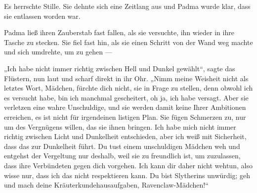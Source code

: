 Es herrschte Stille. Sie dehnte sich eine Zeitlang aus und Padma wurde klar, dass sie entlassen worden war.

Padma ließ ihren Zauberstab fast fallen, als sie versuchte, ihn wieder in ihre Tasche zu stecken. Sie fiel fast hin, als sie einen Schritt von der Wand weg machte und sich umdrehte, um zu gehen —

„Ich habe nicht immer richtig zwischen Hell und Dunkel gewählt“, sagte das Flüstern, nun laut und scharf direkt in ihr Ohr.
„Nimm meine Weisheit nicht als letztes Wort, Mädchen, fürchte dich nicht, sie in Frage zu stellen, denn obwohl ich es versucht habe, bin ich manchmal gescheitert, oh ja, ich habe versagt. Aber sie verletzen eine wahre Unschuldige, und sie werden damit keine Ihrer Ambitionen erreichen, es ist nicht für irgendeinen listigen Plan. Sie fügen Schmerzen zu, nur um des Vergnügens willen, das sie ihnen bringen. Ich habe mich nicht immer richtig zwischen Licht und Dunkelheit entschieden, aber ich weiß mit Sicherheit, dass das zur Dunkelheit führt. Du tust einem unschuldigen Mädchen weh und entgehst der Vergeltung nur deshalb, weil sie zu freundlich ist, um zuzulassen, dass ihre Verbündeten gegen dich vorgehen. Ich kann dir daher nicht wehtun, also wisse nur, dass ich das nicht respektieren kann. Du bist Slytherins unwürdig; geh und mach deine Kräuterkundehausaufgaben, Ravenclaw-Mädchen!“

